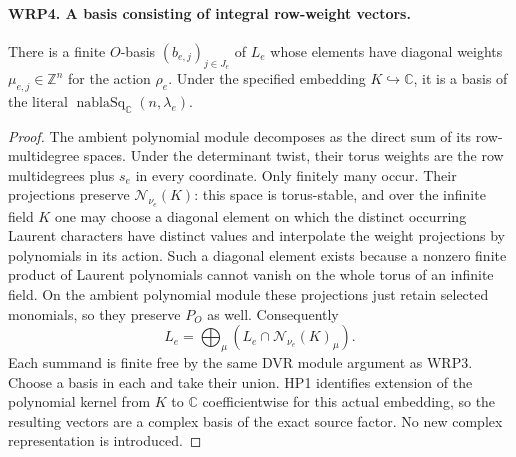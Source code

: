 \paragraph{WRP4. A basis consisting of integral row-weight vectors.}
\label{claim:WRP4}
There is a finite $O$-basis $(b_{e,j})_{j\in J_e}$ of $L_e$
whose elements have diagonal weights
$\mu_{e,j}\in\mathbb Z^n$ for the action
$\rho_e$.  Under the specified embedding
$K\hookrightarrow\mathbb C$, it is a basis of the literal
$\operatorname{nablaSq}_{\mathbb C}(n,\lambda_e)$.
\begin{proof}
The ambient polynomial module decomposes as the direct sum
of its row-multidegree spaces.  Under the determinant twist,
their torus weights are the row multidegrees plus $s_e$ in
every coordinate.  Only finitely many occur.  Their
projections preserve $\mathcal N_{\nu_e}(K)$: this space
is torus-stable, and over the infinite field $K$ one may
choose a diagonal element on which the distinct occurring
Laurent characters have distinct values and interpolate
the weight projections by polynomials in its action.
Such a diagonal element exists because a nonzero finite
product of Laurent polynomials cannot vanish on the whole
torus of an infinite field.  On the ambient polynomial
module these projections just retain selected monomials,
so they preserve $P_O$ as well.  Consequently
\[
                 L_e=\bigoplus_\mu
                         (L_e\cap\mathcal N_{\nu_e}(K)_\mu).
\]
Each summand is finite free by the same DVR module argument
as WRP3.  Choose a basis in each and take their union.
HP1 identifies extension of the polynomial kernel from
$K$ to $\mathbb C$ coefficientwise for this actual embedding,
so the resulting vectors are a complex basis of the exact
source factor.  No new complex representation is introduced.
\end{proof}

